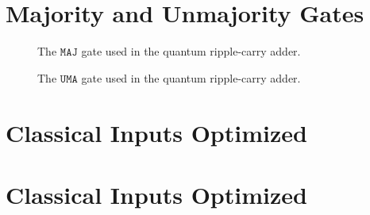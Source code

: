 \begin{appendices}
\section{Majority and Unmajority Gates}
\label{appendix:majGates}
\begin{figure}[htp]
    \centering     
    \begin{minipage}{.45\textwidth}
        
        \caption{The $\texttt{MAJ}$ gate used in the quantum ripple-carry adder.}
        \label{fig:eval_majorityGate}
    \end{minipage}
    \hfill
    \begin{minipage}{.45\textwidth}
        
        \caption{The $\texttt{UMA}$ gate used in the quantum ripple-carry adder.}    
        \label{fig:eval_unmajorityGate}
    \end{minipage}
\end{figure}

\section{Classical Inputs Optimized}
\label{appendix:classicalInputs_optimized}


\section{Classical Inputs Optimized}
\label{appendix:superposInputs_optimized}






\end{appendices}